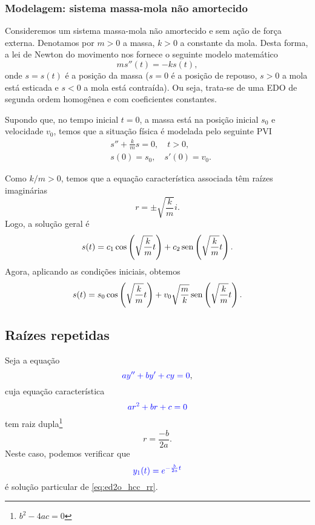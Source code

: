 \subsubsection{Modelagem: sistema massa-mola não amortecido}

Consideremos um sistema massa-mola não amortecido e sem ação de força externa. Denotamos por $m>0$ a massa, $k>0$ a constante da mola. Desta forma, a lei de Newton do movimento nos fornece o seguinte modelo matemático
\begin{equation}
  ms''(t) = -ks(t),
\end{equation}
onde $s = s(t)$ é a posição da massa ($s=0$ é a posição de repouso, $s>0$ a mola está esticada e $s<0$ a mola está contraída). Ou seja, trata-se de uma EDO de segunda ordem homogênea e com coeficientes constantes.

Supondo que, no tempo inicial $t=0$, a massa está na posição inicial $s_0$ e velocidade $v_0$, temos que a situação física é modelada pelo seguinte PVI
\begin{align}
  & s'' + \frac{k}{m}s = 0,\quad t>0,\\
  & s(0) = s_0,\quad s'(0) = v_0.
\end{align}

Como $k/m>0$, temos que a equação característica associada têm raízes imaginárias
\begin{equation}
  r = \pm \sqrt{\frac{k}{m}}i.
\end{equation}
Logo, a solução geral é
\begin{equation}
  s(t) = c_1\cos\left(\sqrt{\frac{k}{m}}t\right) + c_2\operatorname{sen}\left(\sqrt{\frac{k}{m}}t\right).
\end{equation}
Agora, aplicando as condições iniciais, obtemos
\begin{equation}
  s(t) = s_0\cos\left(\sqrt{\frac{k}{m}}t\right) + v_0\sqrt{\frac{m}{k}}\operatorname{sen}\left(\sqrt{\frac{k}{m}}t\right).
\end{equation}

\subsection{Raízes repetidas}

Seja a equação
\begin{equation}\label{eq:ed2o_hcc_rr}
  {\color{blue}ay'' + by' + cy = 0},
\end{equation}
cuja equação característica
\begin{equation}
  {\color{blue}ar^2 + br + c = 0}
\end{equation}
tem raiz dupla\footnote{$b^2-4ac = 0$}
\begin{equation}
  r = \frac{-b}{2a}.
\end{equation}
Neste caso, podemos verificar que
\begin{equation}
  {\color{blue}y_1(t) = e^{-\frac{b}{2a}t}}
\end{equation}
é solução particular de \eqref{eq:ed2o_hcc_rr}.

